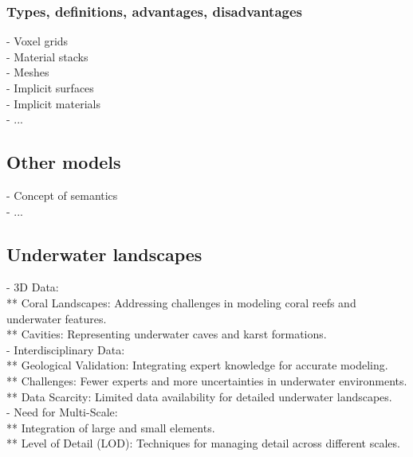 \subsubsection{Types, definitions, advantages, disadvantages}
- Voxel grids \\
- Material stacks \\
- Meshes \\
- Implicit surfaces \\
- Implicit materials \\
- ...

\subsection{Other models}
- Concept of semantics \\
- ...

\subsection{Underwater landscapes}
- 3D Data: \\
** Coral Landscapes: Addressing challenges in modeling coral reefs and underwater features. \\
** Cavities: Representing underwater caves and karst formations. \\
- Interdisciplinary Data: \\
** Geological Validation: Integrating expert knowledge for accurate modeling. \\
** Challenges: Fewer experts and more uncertainties in underwater environments. \\
** Data Scarcity: Limited data availability for detailed underwater landscapes. \\
- Need for Multi-Scale: \\
** Integration of large and small elements. \\
** Level of Detail (LOD): Techniques for managing detail across different scales.

